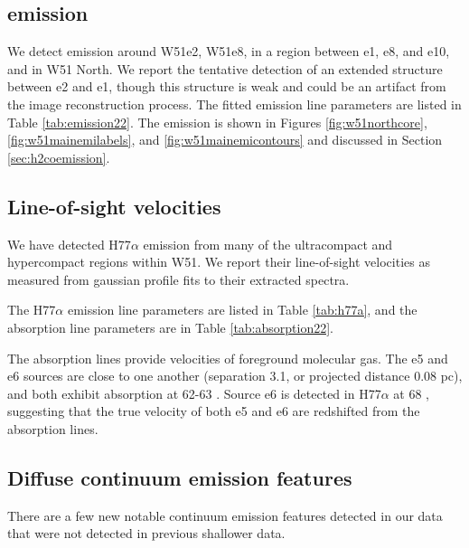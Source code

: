 \subsection{\formaldehyde \twotwo emission}
\label{sec:twotwoemission}
We detect \formaldehyde \twotwo emission around W51e2, W51e8, in a region
between e1, e8, and e10, and in W51 North.  We report the tentative detection
of an extended structure between e2 and e1, though this structure is weak
and could be an artifact from the image reconstruction process.  The fitted
emission line parameters are listed in Table \ref{tab:emission22}.  The
emission is shown in Figures \ref{fig:w51northcore},
\ref{fig:w51mainemilabels}, and \ref{fig:w51mainemicontours} and discussed in
Section \ref{sec:h2coemission}.



\subsection{Line-of-sight velocities}
\label{sec:LOSvelo}
We have detected H77$\alpha$ emission from many of the ultracompact and
hypercompact \hii regions within W51.  We report their line-of-sight velocities
as measured from gaussian profile fits to their extracted spectra.

The H77$\alpha$ emission line parameters are listed in Table \ref{tab:h77a}, and
the \para \twotwo absorption line parameters are in Table \ref{tab:absorption22}.

The \formaldehyde absorption lines provide velocities of foreground molecular
gas.  The e5 and e6 sources are close to one another (separation 3.1\arcsec,
or projected distance 0.08 pc), and both exhibit \formaldehyde absorption at
62-63 \kms.  Source e6 is detected in H77$\alpha$ at 68 \kms, suggesting that
the true velocity of both e5 and e6 are redshifted from the \formaldehyde
absorption lines. 






\subsection{Diffuse continuum emission features}
\label{sec:diffuseemission}
There are a few new notable continuum emission features detected in our data
that were not detected in previous shallower data.

